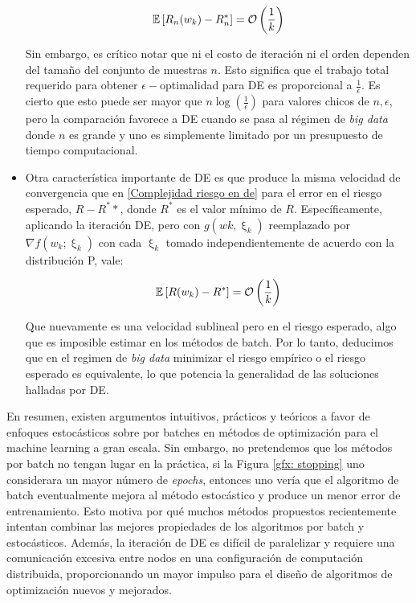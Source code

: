 \begin{itemize}
	\begin{equation}
		\label{Complejidad riesgo en de}
		\mathbb{E} \left[R_n(w_k) - R_n^*\right] = \mathcal{O} \left(\frac{1}{k}\right)
	\end{equation}
	
	Sin embargo, es cr\'itico notar que ni el costo de iteración ni el orden dependen del tamaño del conjunto de muestras $n$. Esto significa que el trabajo total requerido para obtener $\epsilon-$optimalidad para DE es proporcional a $\frac{1}{\epsilon}$. Es cierto que esto puede ser mayor que $n \log \left(\frac{1}{\epsilon}\right)$ para valores chicos de $n, \epsilon$, pero la comparación favorece a DE cuando se pasa al régimen de \textit{big data} donde $n$ es grande y uno es simplemente limitado por un presupuesto de tiempo computacional.
	
	\item Otra característica importante de DE es que produce la misma velocidad de convergencia que en \ref{Complejidad riesgo en de} para el error en el riesgo esperado, $R - R^**$, donde $R^*$ es el valor mínimo de $R$. Específicamente, aplicando la iteración DE, pero con $g(wk, \upxi_{k})$ reemplazado por $\nabla f (w_k; \upxi_{k})$ con cada $\upxi_{k}$ tomado independientemente de acuerdo con la distribución P, vale:
	
	\begin{equation}
		\mathbb{E} \left[R(w_k) - R^*\right] = \mathcal{O} \left(\frac{1}{k}\right)
	\end{equation}
	
	Que nuevamente es una velocidad sublineal pero en el riesgo esperado, algo que es imposible estimar en los m\'etodos de batch. Por lo tanto, deducimos que en el regimen de \textit{big data} minimizar el riesgo emp\'irico o el riesgo esperado es equivalente, lo que potencia la generalidad de las soluciones halladas por DE.
	
\end{itemize}

En resumen, existen argumentos intuitivos, prácticos y teóricos a favor de enfoques estocásticos sobre por batches en métodos de optimización para el machine learning a gran escala. Sin embargo, no pretendemos que los métodos por batch no tengan lugar en la práctica, si la Figura \ref{gfx: stopping} uno considerara un mayor número de \textit{epochs}, entonces uno vería que el algoritmo de batch eventualmente mejora al método estocástico y produce un menor error de entrenamiento. Esto motiva por qué muchos métodos propuestos recientemente intentan combinar las mejores propiedades de los algoritmos por batch y estocásticos. Además, la iteración de DE es difícil de paralelizar y requiere una comunicación excesiva entre nodos en una configuración de computación distribuida, proporcionando un mayor impulso para el diseño de algoritmos de optimización nuevos y mejorados. \cite{agarwal:2017} \cite{atchade:2014}

